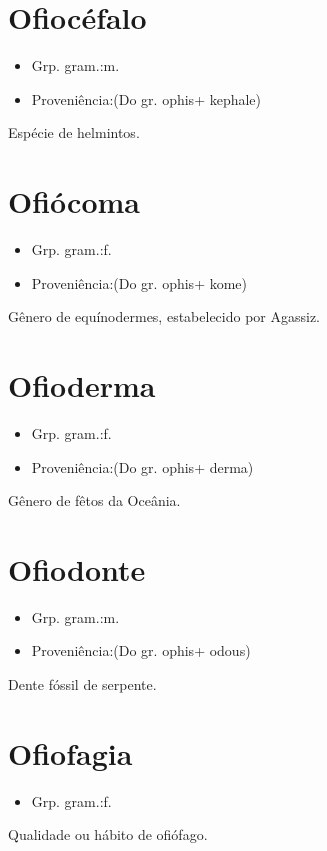 \section{Ofiocéfalo}
\begin{itemize}
\item {Grp. gram.:m.}
\end{itemize}
\begin{itemize}
\item {Proveniência:(Do gr. \textunderscore ophis\textunderscore  + \textunderscore kephale\textunderscore )}
\end{itemize}
Espécie de helmintos.
\section{Ofiócoma}
\begin{itemize}
\item {Grp. gram.:f.}
\end{itemize}
\begin{itemize}
\item {Proveniência:(Do gr. \textunderscore ophis\textunderscore  + \textunderscore kome\textunderscore )}
\end{itemize}
Gênero de equínodermes, estabelecido por Agassiz.
\section{Ofioderma}
\begin{itemize}
\item {Grp. gram.:f.}
\end{itemize}
\begin{itemize}
\item {Proveniência:(Do gr. \textunderscore ophis\textunderscore  + \textunderscore derma\textunderscore )}
\end{itemize}
Gênero de fêtos da Oceânia.
\section{Ofiodonte}
\begin{itemize}
\item {Grp. gram.:m.}
\end{itemize}
\begin{itemize}
\item {Proveniência:(Do gr. \textunderscore ophis\textunderscore  + \textunderscore odous\textunderscore )}
\end{itemize}
Dente fóssil de serpente.
\section{Ofiofagia}
\begin{itemize}
\item {Grp. gram.:f.}
\end{itemize}
Qualidade ou hábito de ofiófago.
